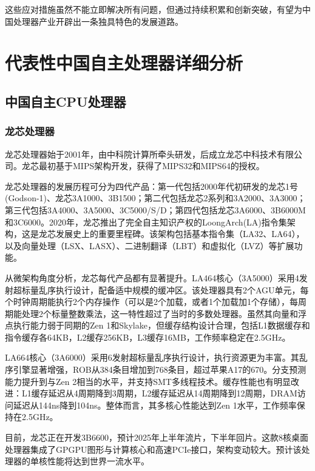 \documentclass[a4paper,colorlinks=true,linkcolor=blue,urlcolor=blue,citecolor=green,bookmarks=true]{article}
\begin{document}
这些应对措施虽然不能立即解决所有问题，但通过持续积累和创新突破，有望为中国处理器产业开辟出一条独具特色的发展道路。

\section{代表性中国自主处理器详细分析}

\subsection{中国自主CPU处理器}

\subsubsection{龙芯处理器}

龙芯处理器始于2001年，由中科院计算所牵头研发，后成立龙芯中科技术有限公司。龙芯最初基于MIPS架构开发，获得了MIPS32和MIPS64的授权。

龙芯处理器的发展历程可分为四代产品：第一代包括2000年代初研发的龙芯1号(Godson-1)、龙芯3A1000、3B1500；第二代包括龙芯2系列和3A2000、3A3000；第三代包括3A4000、3A5000、3C5000/S/D；第四代包括龙芯3A6000、3B6000M和3C6000。2020年，龙芯推出了完全自主知识产权的LoongArch(LA)指令集架构，这是龙芯发展史上的重要里程碑。该架构包括基本指令集（LA32、LA64），以及向量处理（LSX、LASX）、二进制翻译（LBT）和虚拟化（LVZ）等扩展功能\cite{6}\cite{9}\cite{10}\cite{11}\cite{12}。

从微架构角度分析，龙芯每代产品都有显著提升。LA464核心（3A5000）采用4发射超标量乱序执行设计，配备适中规模的缓冲区。该处理器具有2个AGU单元，每个时钟周期能执行2个内存操作（可以是2个加载，或者1个加载加1个存储），每周期能处理2个标量整数乘法，这一特性超过了当时的多数处理器。虽然其向量和浮点执行能力弱于同期的Zen 1和Skylake，但缓存结构设计合理，包括L1数据缓存和指令缓存各64KB，L2缓存256KB，L3缓存16MB，工作频率稳定在2.5GHz\cite{6}\cite{10}\cite{12}。

LA664核心（3A6000）采用6发射超标量乱序执行设计，执行资源更为丰富。其乱序引擎显著增强，ROB从384条目增加到768条目，超过苹果A17的670。分支预测能力提升到与Zen 2相当的水平，并支持SMT多线程技术。缓存性能也有明显改进：L1缓存延迟从4周期降到3周期，L2缓存延迟从14周期降到12周期，DRAM访问延迟从144ns降到104ns。整体而言，其多核心性能达到Zen 1水平，工作频率保持在2.5GHz\cite{6}\cite{10}\cite{12}。

目前，龙芯正在开发3B6600，预计2025年上半年流片，下半年回片。这款8核桌面处理器集成了GPGPU图形与计算核心和高速PCIe接口，架构变动较大。预计该处理器的单核性能将达到世界一流水平。
\end{document}
